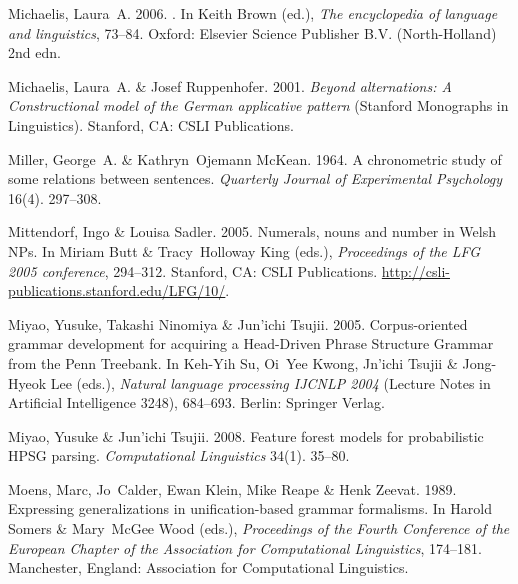 \begin{thebibliography}{1420}
Michaelis, Laura~A. 2006.
.
\newblock In Keith Brown (ed.), \emph{The encyclopedia of language and
  linguistics}, 73--84. Oxford: Elsevier Science Publisher B.V. (North-Holland)
  2nd edn.

Michaelis, Laura~A. \& Josef Ruppenhofer. 2001.
\newblock \emph{Beyond alternations: {A} {Constructional} model of the {German}
  applicative pattern}  (Stanford Monographs in Linguistics).
\newblock Stanford, CA: CSLI Publications.

Miller, George~A. \& Kathryn~Ojemann McKean. 1964.
\newblock A chronometric study of some relations between sentences.
\newblock \emph{Quarterly Journal of Experimental Psychology} 16(4). 297--308.

Mittendorf, Ingo \& Louisa Sadler. 2005.
\newblock Numerals, nouns and number in {Welsh NPs}.
\newblock In Miriam Butt \& Tracy~Holloway King (eds.), \emph{Proceedings of
  the {LFG 2005} conference}, 294--312. Stanford, CA: CSLI Publications.
\newblock \urlprefix\url{http://csli-publications.stanford.edu/LFG/10/}.

Miyao, Yusuke, Takashi Ninomiya \& Jun'ichi Tsujii. 2005.
\newblock Corpus-oriented grammar development for acquiring a {Head-Driven
  Phrase Structure Grammar} from the {Penn Treebank}.
\newblock In Keh-Yih Su, Oi~Yee Kwong, Jn'ichi Tsujii \& Jong-Hyeok Lee (eds.),
  \emph{Natural language processing {IJCNLP 2004}} (Lecture Notes in Artificial
  Intelligence 3248), 684--693. Berlin: Springer Verlag.

Miyao, Yusuke \& Jun'ichi Tsujii. 2008.
\newblock Feature forest models for probabilistic {HPSG} parsing.
\newblock \emph{Computational Linguistics} 34(1). 35--80.

Moens, Marc, Jo~Calder, Ewan Klein, Mike Reape \& Henk Zeevat. 1989.
\newblock Expressing generalizations in unification-based grammar formalisms.
\newblock In Harold Somers \& Mary~McGee Wood (eds.), \emph{Proceedings of the
  {Fourth Conference of the European Chapter of the Association for
  Computational Linguistics}}, 174--181. Manchester, England: Association for
  Computational Linguistics.


\end{thebibliography}
